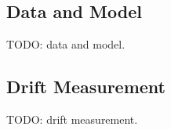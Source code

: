 
\subsection{Data and Model}
TODO: data and model.

\subsection{Drift Measurement}
TODO: drift measurement.
